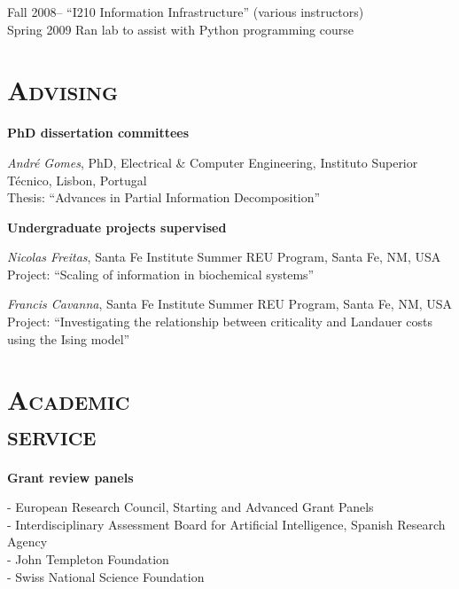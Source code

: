 \documentclass[margin,line,centered]{res}
\newcommand\bigtab{\tabto{2.4cm}}
\newcommand\yeartab{\tabto{1.3cm}}
\newcommand\smalltab{\tabto{.3cm}}
\newcommand\minorhead[1]{\textbf{#1}\vspace{-3pt}}
\newcommand\rldate[1]{\makebox[33pt][r]{#1}}
\begin{document}
\begin{resume}
Fall 2008-- \bigtab ``I210 Information Infrastructure'' (various instructors)\\
\smalltab Spring 2009 \bigtab Ran lab to assist with Python programming course


\section{\textsc{Advising}}

\minorhead{PhD dissertation committees}

\rldate{2025} \yeartab \emph{André Gomes}, PhD, Electrical \& Computer Engineering, Instituto Superior Técnico, Lisbon, Portugal\\
\yeartab Thesis: ``Advances in Partial Information Decomposition''

\vspace{5pt}
\minorhead{Undergraduate projects supervised}

\rldate{2018} \yeartab \emph{Nicolas Freitas}, Santa Fe Institute Summer REU Program, Santa Fe, NM, USA \\
\yeartab Project: ``Scaling of information in biochemical systems''

\rldate{2017} \yeartab \emph{Francis Cavanna}, Santa Fe Institute Summer REU Program, Santa Fe, NM, USA \\
\yeartab Project: ``Investigating the relationship between criticality and Landauer costs using the Ising model''

\section{\textsc{Academic\\service}}

\minorhead{Grant review panels}

- European Research Council, Starting and Advanced Grant Panels\\
- Interdisciplinary Assessment Board for Artificial Intelligence, Spanish Research Agency\\
- John Templeton Foundation\\
- Swiss National Science Foundation


\end{resume}
\end{document}

